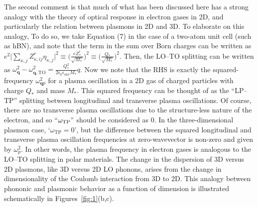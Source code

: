 \documentclass[aps,prb,twocolumn,
	           groupedaddress,superscriptaddress,
               amsfonts,amssymb,amsmath,floatfix,
	           citeautoscript]{revtex4-1}
\begin{document}
The second comment is that much of what has been discussed here has a strong analogy with the theory of optical response in electron gases in 2D, and particularly the relation between plasmons in 2D and 3D. To elaborate on this analogy, To do so, we take Equation (7) in the case of a two-atom unit cell (such as hBN), and note that the term in the sum over Born charges can be written as $e^2\big|\sum_{\kappa,j}Z^r_{\kappa,ij}\eta_{\kappa,j}  \big|^2 \equiv  \Big(\frac{eZ^r_*}{\sqrt{M_*}}\Big)^2 \equiv \Big(\frac{Q_*}{\sqrt{M_*}}\Big)^2$. Then, the LO--TO splitting can be written as $\omega^2_{\mathbf{q}} - \omega^2_{\mathbf{q},\mathrm{TO}} = \frac{Q_*^2}{2\epsilon_0\epsilon_{\mathrm{env}} M_*}q$. Now we note that the RHS is exactly the squared-frequency $\omega^2_{\mathbf{q}p}$ for a plasma oscillation in a 2D gas of charged particles with charge $Q_*$ and mass $M_*$. This squared frequency can be thought of as the ``LP--TP'' splitting between longitudinal and transverse plasma oscillations. Of course, there are no transverse plasma oscillations due to the structure-less nature of the electron, and so ``$\omega_{\mathrm{TP}}"$  should be considered as 0. In the three-dimensional plasmon case, `$\omega_{\mathrm{TP}} = 0$', but the difference between the squared longitudinal and transverse plasma oscillation frequencies at zero-wavevector is non-zero and given by $\omega_p^2$. In other words, the plasma frequency in electron gases is analogous to the LO--TO splitting in polar materials. The change in the dispersion of 3D versus 2D plasmons, like 3D versus 2D LO phonons, arises from the change in dimensionality of the Coulomb interaction from 3D to 2D.  This analogy between phononic and plasmonic behavior as a function of dimension is illustrated schematically in Figures~\ref{fig:1}(b,c).
  
\end{document}
